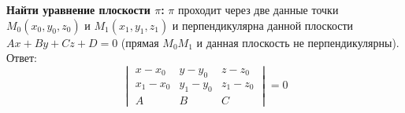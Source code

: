 \textbf{Найти уравнение плоскости $\pi$:} $\pi$ проходит через две данные точки $M_0(x_0,y_0,z_0)$ и $M_1(x_1,y_1,z_1)$ и  перпендикулярна данной плоскости $Ax + By + Cz + D = 0$ (прямая $M_0M_1$ и данная плоскость не перпендикулярны). Ответ: $$\begin{vmatrix} x-x_0 & y-y_0 & z-z_0\\ x_1-x_0 & y_1-y_0 & z_1-z_0 \\ A & B & C \end{vmatrix} = 0 $$